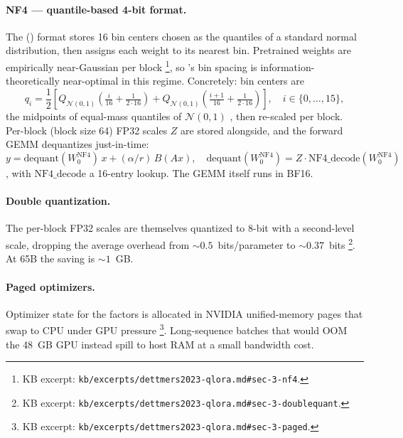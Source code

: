 \paragraph{NF4 — quantile-based 4-bit format.} The
\emph{} () format stores 16 bin centers chosen as the
quantiles of a standard normal distribution, then assigns each weight
to its nearest bin. Pretrained weights are empirically near-Gaussian
per block \citep[\S 3]{dettmers2023-qlora}\footnote{KB excerpt:
\nolinkurl{kb/excerpts/dettmers2023-qlora.md#sec-3-nf4}.}, so 's bin
spacing is information-theoretically near-optimal in this regime.
Concretely: bin centers are
\begin{equation}
q_i = \frac{1}{2}\!\left[Q_{\mathcal{N}(0,1)}\!\left(\tfrac{i}{16} + \tfrac{1}{2 \cdot 16}\right) + Q_{\mathcal{N}(0,1)}\!\left(\tfrac{i+1}{16} + \tfrac{1}{2 \cdot 16}\right)\right],
\quad i \in \{0,\ldots,15\},
\label{eq:nf4-bins}
\end{equation}
the midpoints of equal-mass quantiles of $\mathcal{N}(0,1)$
\citep[\S 3]{dettmers2023-qlora}, then re-scaled per block. Per-block
(block size 64) FP32 scales $Z$ are stored alongside, and the forward
GEMM dequantizes just-in-time:
\begin{equation}
y = \mathrm{dequant}(W_0^{\text{NF4}})\, x + (\alpha / r)\, B (A x),
\quad
\mathrm{dequant}(W_0^{\text{NF4}}) = Z \cdot \mathrm{NF4\_decode}(W_0^{\text{NF4}})
\label{eq:qlora-fwd}
\end{equation}
\citep[\S 3]{dettmers2023-qlora}, with $\mathrm{NF4\_decode}$ a 16-entry
lookup. The GEMM itself runs in BF16.

\paragraph{Double quantization.} The per-block FP32 scales are
themselves quantized to 8-bit with a second-level scale, dropping the
average overhead from $\sim\!0.5$~bits/parameter to $\sim\!0.37$~bits
\citep[\S 3]{dettmers2023-qlora}\footnote{KB excerpt:
\nolinkurl{kb/excerpts/dettmers2023-qlora.md#sec-3-doublequant}.}. At
65B  the saving is $\sim\!1$~GB.

\paragraph{Paged optimizers.} Optimizer state for the  factors is
allocated in NVIDIA unified-memory pages that swap to CPU under GPU
pressure \citep[\S 3]{dettmers2023-qlora}\footnote{KB excerpt:
\nolinkurl{kb/excerpts/dettmers2023-qlora.md#sec-3-paged}.}. Long-sequence
batches that would OOM the 48~GB GPU instead spill to host RAM at a
small bandwidth cost.

